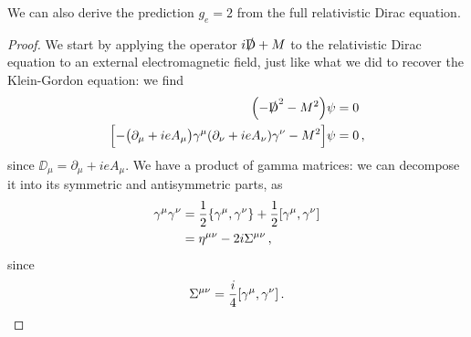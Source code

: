 \documentclass[main.tex]{subfiles}
\begin{document}
\begin{claim}
We can also derive the prediction \(g_e = 2\) from the full relativistic Dirac equation.
\end{claim}

\begin{proof}
We start by applying the operator \(i\slashed{\mathrm{D}} + M\) to the relativistic Dirac equation to an external electromagnetic field, just like what we did to recover the Klein-Gordon equation: we find 
%
\begin{subequations}
\begin{align}
\qty(-\slashed{\mathrm{D}}^2 - M^2) \psi &= 0  \\
\qty[ - \qty(\partial_{\mu } +ieA_{\mu }) \gamma^{\mu } \qty(\partial_{\nu } + ieA_{\nu }) \gamma^{\nu } - M^2] \psi  & =0
\,,
\end{align}
\end{subequations}
%
since \(\DD_{\mu } = \partial_{\mu } + ieA_{\mu }\).
We have a product of gamma matrices: we can decompose it into its symmetric and antisymmetric parts, as 
%
\begin{subequations}
\begin{align}
\gamma^{\mu } \gamma^{\nu } &= \frac{1}{2} \qty{\gamma^{\mu }, \gamma^{\nu }}  + \frac{1}{2} \qty[\gamma^{\mu } , \gamma^{\nu }]\\
&= \eta^{\mu \nu } -2i \Sigma^{\mu \nu }
\,,
\end{align}
\end{subequations}
%
since 
%
\begin{align}
\Sigma^{\mu \nu } = \frac{i}{4} \qty[\gamma^{\mu }, \gamma^{\nu }]
\,.
\end{align}


\end{proof}
\end{document}
